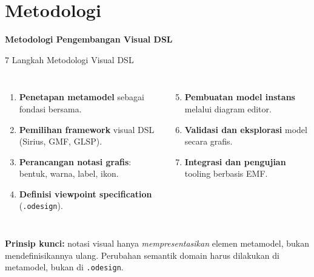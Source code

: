 \documentclass[aspectratio=169, table]{beamer}
\begin{document}
\section{Metodologi}
\begin{frame}{\hfill}
	\centering
	\Huge{\textbf{Metodologi Pengembangan Visual DSL}}
\end{frame}

\begin{frame}{7 Langkah Metodologi Visual DSL}
\vspace{4pt}
\begin{columns}[T]
\begin{enumerate}
  \item \textbf{Penetapan metamodel} sebagai fondasi bersama.
  \item \textbf{Pemilihan framework} visual DSL (Sirius, GMF, GLSP).
  \item \textbf{Perancangan notasi grafis}: bentuk, warna, label, ikon.
  \item \textbf{Definisi viewpoint specification} (\texttt{.odesign}).
\end{enumerate}

\begin{enumerate}
  \setcounter{enumi}{4}
  \item \textbf{Pembuatan model instans} melalui diagram editor.
  \item \textbf{Validasi dan eksplorasi} model secara grafis.
  \item \textbf{Integrasi dan pengujian} tooling berbasis EMF.
\end{enumerate}
\end{columns}

\vspace{10pt}
\small
\textbf{Prinsip kunci:} notasi visual hanya \textit{mempresentasikan} elemen metamodel, bukan mendefinisikannya ulang. Perubahan semantik domain harus dilakukan di metamodel, bukan di \texttt{.odesign}.
\end{frame}
\end{document}
